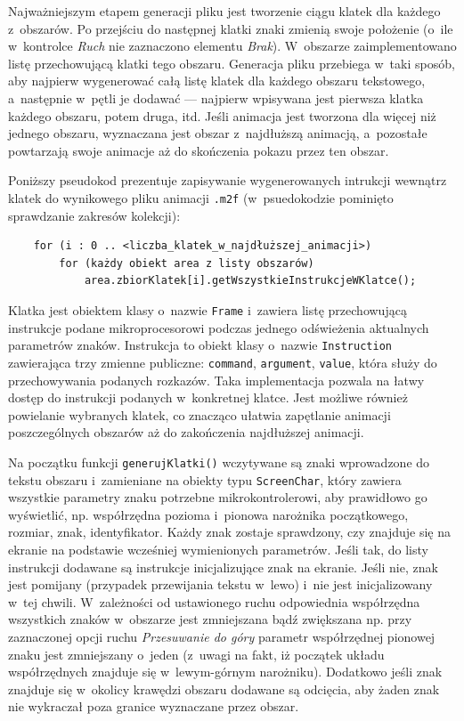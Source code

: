 Najważniejszym etapem generacji pliku jest tworzenie ciągu klatek dla każdego z~obszarów. Po przejściu do następnej klatki znaki zmienią swoje położenie (o~ile w~kontrolce \textit{Ruch} nie zaznaczono elementu \textit{Brak}). W~obszarze zaimplementowano listę przechowującą klatki tego obszaru. Generacja pliku przebiega w~taki sposób, aby najpierw wygenerować całą listę klatek dla każdego obszaru tekstowego, a~następnie w~pętli je dodawać --- najpierw wpisywana jest pierwsza klatka każdego obszaru, potem druga, itd. Jeśli animacja jest tworzona dla więcej niż jednego obszaru, wyznaczana jest obszar z~najdłuższą animacją, a~pozostałe powtarzają swoje animacje aż do skończenia pokazu przez ten obszar.

Poniższy pseudokod prezentuje zapisywanie wygenerowanych intrukcji wewnątrz klatek do wynikowego pliku animacji \texttt{.m2f} (w~psuedokodzie pominięto sprawdzanie zakresów kolekcji):

\begin{verbatim}
    for (i : 0 .. <liczba_klatek_w_najdłuższej_animacji>)
        for (każdy obiekt area z listy obszarów)
            area.zbiorKlatek[i].getWszystkieInstrukcjeWKlatce();
\end{verbatim}

Klatka jest obiektem klasy o~nazwie \texttt{Frame} i~zawiera listę przechowującą instrukcje podane mikroprocesorowi podczas jednego odświeżenia aktualnych parametrów znaków. Instrukcja to obiekt klasy o~nazwie \texttt{Instruction} zawierająca trzy zmienne publiczne: \texttt{command}, \texttt{argument}, \texttt{value}, która służy do przechowywania podanych rozkazów. Taka implementacja pozwala na łatwy dostęp do instrukcji podanych w~konkretnej klatce. Jest możliwe również powielanie wybranych klatek, co znacząco ułatwia zapętlanie animacji poszczególnych obszarów aż do zakończenia najdłuższej animacji.

Na początku funkcji \texttt{generujKlatki()} wczytywane są znaki wprowadzone do tekstu obszaru i~zamieniane na obiekty typu \texttt{ScreenChar}, który zawiera wszystkie parametry znaku potrzebne mikrokontrolerowi, aby prawidłowo go wyświetlić, np. współrzędna pozioma i~pionowa narożnika początkowego, rozmiar, znak, identyfikator. Każdy znak zostaje sprawdzony, czy znajduje się na ekranie na podstawie wcześniej wymienionych parametrów. Jeśli tak, do listy instrukcji dodawane są instrukcje inicjalizujące znak na ekranie. Jeśli nie, znak jest pomijany (przypadek przewijania tekstu w~lewo) i~nie jest inicjalizowany w~tej chwili. W~zależności od ustawionego ruchu 
odpowiednia współrzędna wszystkich znaków w~obszarze jest zmniejszana bądź zwiększana np. przy zaznaczonej opcji ruchu \textit{Przesuwanie do góry} parametr współrzędnej pionowej znaku jest zmniejszany o~jeden (z~uwagi na fakt, iż początek układu współrzędnych znajduje się w~lewym-górnym narożniku). Dodatkowo jeśli znak znajduje się w~okolicy krawędzi obszaru dodawane są odcięcia, aby żaden znak nie wykraczał poza granice wyznaczane przez obszar. 

